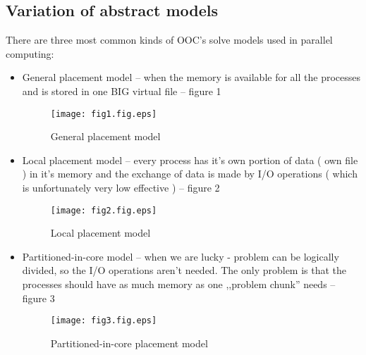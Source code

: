 \subsection{Variation of abstract models}
There are three most common kinds of OOC's solve models used in parallel computing: \cite{kzajac1}
\begin{itemize}
	\item{General placement model} -- when the memory is available for all the processes and is stored in one BIG virtual file -- figure 1
	\begin{figure}[h!]
		\begin{center}
			\texttt{[image: fig1.fig.eps]}
			\caption{General placement model}
		\end{center}
	\end{figure}
	\item{Local placement model} -- every process has it's own portion of data ( own file ) in it's memory and the exchange of data is made by I/O operations ( which is unfortunately very low effective ) -- figure 2
	\begin{figure}[h!]
		\begin{center}
			\texttt{[image: fig2.fig.eps]}
			\caption{Local placement model}
		\end{center}
	\end{figure}
	\item{Partitioned-in-core model} --
	when we are lucky - problem can be logically divided, so the I/O operations aren't needed.
	The only problem is that the processes should have as much memory as one ,,problem chunk'' needs -- figure 3

	
	\begin{figure}[h!]
		\begin{center}
			\texttt{[image: fig3.fig.eps]}
			\caption{Partitioned-in-core placement model}
		\end{center}
	\end{figure}
	
\end{itemize}

